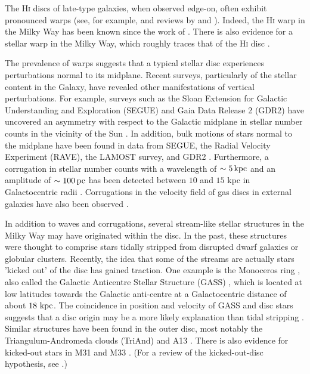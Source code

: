 The \textsc{Hi} discs of late-type galaxies, when observed edge-on,
often exhibit pronounced warps (see, for example,
\citet{sancisi_1976,bosma_1991, garcia-ruiz_2002} and reviews by
\citet{binney_1992} and \citet{Sellwood2013}). Indeed, the \textsc{Hi}
warp in the Milky Way has been known since the work of
\citet{oort_1958}. There is also evidence for a stellar warp in the
Milky Way, which roughly traces that of the \textsc{Hi} disc
\citep{cox_1996, reyle_2009}.

The prevalence of warps suggests that a typical stellar disc
experiences perturbations normal to its midplane. Recent surveys,
particularly of the stellar content in the Galaxy, have revealed other
manifestations of vertical perturbations. For example, surveys such as
the Sloan Extension for Galactic Understanding and Exploration (SEGUE)
and Gaia Data Release 2 (GDR2) have uncovered an asymmetry with
respect to the Galactic midplane in stellar number counts in the
vicinity of the Sun \citep{widrow_2012_sdss, yanny_gardner_2013,
  bennet_2019_gaia}. In addition, bulk motions of stars normal to the
midplane have been found in data from SEGUE, the Radial Velocity
Experiment (RAVE), the LAMOST survey, and GDR2
\citep{widrow_2012_sdss, williams_2013_rave, carlin_2013_lamost,
  pearl_2017, carrillo_2018_rave, gaia_collab}. Furthermore, a
corrugation in stellar number counts with a wavelength of $\sim
5\,{\rm kpc}$ and an amplitude of $\sim 100\,{\rm pc}$ has been
detected between $10$ and $15$ kpc in Galactocentric radii
\citep{xu_2015}. Corrugations in the velocity field of gas discs
in external galaxies have also been observed \citep[for
  example]{matthews_2008,sanchez_2015}.

In addition to waves and corrugations, several stream-like stellar
structures in the Milky Way may have originated within the
disc. In the past, these structures were thought to comprise stars
tidally stripped from disrupted dwarf galaxies or globular
clusters. Recently, the idea that some of the streams are actually
stars 'kicked out' of the disc has gained traction. One example is the
Monoceros ring \citep{newberg_2002, yanny_2003}, also called the
Galactic Anticentre Stellar Structure (GASS) \citep{crane_2003,
  rocha-pinto_2003}, which is located at low latitudes towards the
Galactic anti-centre at a Galactocentric distance of about
$18\,\,\text{kpc}$. The coincidence in position and velocity of GASS and
disc stars suggests that a disc origin may be a more likely explanation than tidal stripping \citep{deason_2018,
  monoceros_disk_origin}. Similar structures have been found in the
outer disc, most notably the Triangulum-Andromeda clouds (TriAnd)
\citep{triand_discovery} and A13 \citep{a13_discovery}. There is also
evidence for kicked-out stars in M31 \citep{richardson_2008_m31,
  dorman_2013_m31, bernard_2015_m31} and M33
\citep{mcconnachie_2006_m33, mcconnachie_2010_m33}. (For a review of
the kicked-out-disc hypothesis, see \citet{johnston_kud_review}.)

